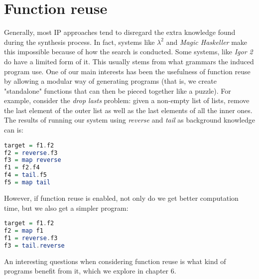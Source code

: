 \section{Function reuse}

\indent \indent Generally, most IP approaches tend to disregard the extra knowledge found during the synthesis process. In fact, systems like \textit{$\lambda^{2}$} and \textit{Magic Haskeller} make this impossible because of how the search is conducted. Some systems, like \textit{Igor 2} do have a limited form of it. This usually stems from what grammars the induced program use. One of our main interests has been the usefulness of function reuse by allowing a modular way of generating programs (that is, we create "standalone" functions that can then be pieced together like a puzzle). For example, consider the \textit{drop lasts} problem: given a non-empty list of lists, remove the last element of the outer list as well as the last elements of all the inner ones. The results of running our system using \textit{reverse} and \textit{tail} as background knowledge can is:

\begin{exam}
\begin{lstlisting}[language=Haskell]
target = f1.f2
f2 = reverse.f3
f3 = map reverse
f1 = f2.f4
f4 = tail.f5
f5 = map tail
\end{lstlisting}
\end{exam}

However, if function reuse is enabled, not only do we get better computation time, but we also get a simpler program:

\begin{exam}
\begin{lstlisting}[language=Haskell]
target = f1.f2
f2 = map f1
f1 = reverse.f3
f3 = tail.reverse
\end{lstlisting}
\end{exam}

An interesting questions when considering function reuse is what kind of programs benefit from it, which we explore in chapter 6.